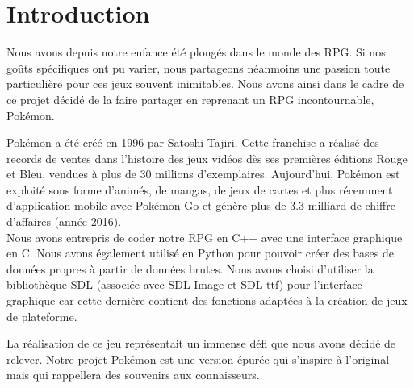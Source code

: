 \vspace*{0.5cm}

\section*{Introduction}
{}
\vspace*{0.5cm}

Nous avons depuis notre enfance été plongés dans le monde des RPG. Si nos goûts spécifiques ont pu varier, nous partageons néanmoins une passion toute particulière pour ces jeux souvent inimitables. Nous avons ainsi dans le cadre de ce projet décidé de la faire partager en reprenant un RPG incontournable, Pokémon. 
\vspace*{0.5cm}

Pokémon a été créé en 1996 par Satoshi Tajiri. Cette franchise a réalisé des records de ventes dans l'histoire des jeux vidéos dès ses premières éditions Rouge et Bleu, vendues à plus de 30 millions d'exemplaires. Aujourd'hui, Pokémon est exploité sous forme d'animés, de mangas, de jeux de cartes et plus récemment d'application mobile avec Pokémon Go et génère plus de 3.3 milliard de chiffre d'affaires (année 2016). \\
Nous avons entrepris de coder notre RPG en C++ avec une interface graphique en C. Nous avons également utilisé en Python pour pouvoir créer des bases de données propres à partir de données brutes. Nous avons choisi d’utiliser la bibliothèque SDL (associée avec SDL Image et SDL ttf) pour l'interface graphique car cette dernière contient des fonctions adaptées à la création de jeux de plateforme. 
\vspace*{0.5cm}

La réalisation de ce jeu représentait un immense défi que nous avons décidé de relever. Notre projet Pokémon est une version épurée qui s'inspire à l'original mais qui rappellera des souvenirs aux connaisseurs.
\vspace*{1cm}

